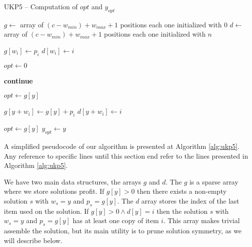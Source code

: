 \documentclass[runningheads,a4paper]{llncs}
\begin{document}
\begin{algorithm}[!t]
\caption{UKP5 -- Computation of $opt$ and $y_{opt}$}\label{alg:ukp5}
\begin{algorithmic}[1]
  \State \(g \gets\) array of \((c - w_{min}) + w_{max} + 1\) positions each one initialized with \(0\)\label{create_g}
  \State \(d \gets\) array of \((c - w_{min}) + w_{max} + 1\) positions each one initialized with \(n\)\label{create_d}
  
  \label{begin_trivial_bounds}
      \State \(g[w_i] \gets p_i\)
      \State \(d[w_i] \gets i\)
    \EndIf
  \EndFor\label{end_trivial_bounds}

  \State \(opt \gets 0\)\label{init_opt}

  \label{main_ext_loop_begin}
    \label{if_less_than_opt_begin}
    	\State \textbf{continue}\label{alg:continue}
    \EndIf\label{if_less_than_opt_end}
    
    \State \(opt \gets g[y]\)\label{update_opt}
    
    \label{main_inner_loop_begin}
      \label{if_new_lower_bound_begin}
        \State \(g[y + w_i] \gets g[y] + p_i\)
        \State \(d[y + w_i] \gets i\)
      \EndIf\label{if_new_lower_bound_end}
    \EndFor\label{main_inner_loop_end}
  \EndFor\label{main_ext_loop_end}

  \label{get_y_opt_loop_begin}
    \label{last_loop_inner_if}
      \State \(opt \gets g[y]\)
      \State \(y_{opt} \gets y\)
    \EndIf
  \EndFor\label{get_y_opt_loop_end}
\EndProcedure
\end{algorithmic}
\end{algorithm}

A simplified pseudocode of our algorithm is presented at Algorithm \ref{alg:ukp5}. Any reference to specific lines until this section end refer to the lines presented in Algorithm \ref{alg:ukp5}.

We have two main data structures, the arrays \(g\) and \(d\). The \(g\) is a sparse array where we store solutions profit. If \(g[y] > 0\) then there exists a non-empty solution \(s\) with \(w_s = y\) and \(p_s = g[y]\). The \(d\) array stores the index of the last item used on the solution. If \(g[y] > 0 \land d[y] = i\) then the solution \(s\) with \(w_s = y\) and \(p_s = g[y]\) has at least one copy of item \(i\). This array makes trivial assemble the solution, but its main utility is to prune solution symmetry, as we will describe below.
\end{document}
